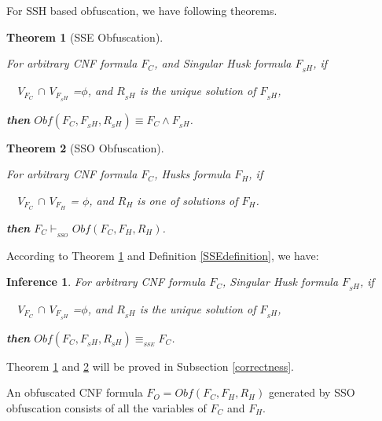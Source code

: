 \documentclass[conference]{IEEEtran}
\newtheorem{theorem}{\textbf{Theorem}}
\newtheorem{definition}{\textbf{Definition}}
\newtheorem{inference}{\textbf{Inference}}
\begin{document}

For SSH based obfuscation, we have following theorems.

\begin{theorem}[SSE Obfuscation]\label{SSEtheorem}

For arbitrary CNF formula $F_C$, and Singular Husk formula $F_{_SH}$, 
if

~~$V_{F_C}$ $\cap$ $V_{F_{_SH}}$ =$\phi$, and
$R_{_SH}$ is the unique solution of $F_{_SH}$,

\textbf{then} $Obf(F_C,F_{_SH},R_{_SH}) \equiv F_C\wedge F_{_SH}$.
\end{theorem}

\begin{theorem}[SSO Obfuscation]\label{SSOtheorem}

For arbitrary CNF formula $F_C$, Husks formula $F_H$, if
  
~~$V_{F_C}$ $\cap$ $V_{F_H}$ = $\phi$, and
$R_H$ is one of solutions of $F_H$.
  
\textbf{then} $F_C \vdash_{_{SSO}} Obf(F_C,F_H,R_H)$.
\end{theorem}

According to Theorem \ref{SSEtheorem} and Definition \ref{SSEdefinition}, we have:
\begin{inference}\label{SSEinference}
For arbitrary CNF formula $F_C$, Singular Husk formula $F_{_SH}$, if

~~$V_{F_C}$ $\cap$ $V_{F_{_SH}}$ =$\phi$, and
$R_{_SH}$ is the unique solution of $F_{_SH}$,

\textbf{then} $Obf(F_C,F_{_SH},R_{_SH}) \equiv_{_{SSE}} F_C$.
\end{inference}

Theorem \ref{SSEtheorem} and \ref{SSOtheorem} will be proved in Subsection \ref{correctness}.

An obfuscated CNF formula $F_O=Obf(F_C,F_H,R_H)$ generated by SSO obfuscation 
consists of all the variables of $F_C$ and $F_H$.
\end{document}
